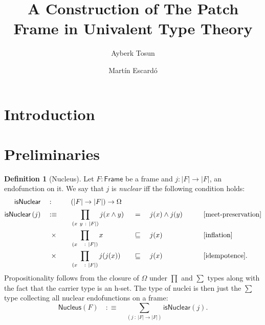\documentclass[11pt,a4paper]{article}
\title{A Construction of The Patch Frame in Univalent Type Theory}
\author{Ayberk Tosun \and Mart\'{i}n Escard\'{o}}
\theoremstyle{definition}
\newtheorem{defn}{Definition}
\newcommand{\is}{:\equiv}
\newcommand{\framenm}{\mathsf{Frame}}
\newcommand{\isnuclearnm}{\mathsf{isNuclear}}
\newcommand{\isnuclear}[1]{\isnuclearnm{}\left(#1\right)}
\newcommand{\nucleus}{\mathsf{Nucleus}}
\newcommand{\abs}[1]{\left| #1 \right|}
\newcommand{\hprop}{\Omega}
\newcommand{\meet}[2]{#1 \wedge #2}
\newcommand{\pity}[3]{\prod_{(#1~:~#2)} #3}
\newcommand{\sigmaty}[3]{\sum_{(#1~:~#2)} #3}
\begin{document}
\maketitle

\begin{abstract}
\end{abstract}

\section{Introduction}


\section{Preliminaries}

\begin{defn}[Nucleus]\label{defn:nucleus}
  Let $F : \framenm{}$ be a frame and $j : \abs{F} \rightarrow \abs{F}$, an endofunction
  on it. We say that $j$ is \emph{nuclear} iff the following condition holds:
  \begin{alignat*}{5}
    \isnuclearnm{}\quad&:\quad &&(\abs{F} \rightarrow \abs{F}) \rightarrow \hprop{} && && &&              \\
    \isnuclear{j} \quad&\is\quad
       &&\pity{x~y}{\abs{F}}{j(\meet{x}{y}) &&~=~ &&\meet{j(x)}{j(y)}}   &&\qquad[\text{meet-preservation}]\\
      &\hspace{0.5em}\times\quad &&\pity{x~~}{\abs{F}}{x &&~\sqsubseteq~ &&j(x)}            &&\qquad[\text{inflation}]  \\
      &\hspace{0.5em}\times\quad &&\pity{x~~}{\abs{F}}{j(j(x)) &&~\sqsubseteq~ &&j(x)}      &&\qquad[\text{idempotence}].
  \end{alignat*}
  Propositionality follows from the closure of $\Omega$ under $\prod$ and $\sum$ types along
  with the fact that the carrier type is an h-set. The type of nuclei is then
  just the $\sum$ type collecting all nuclear endofunctions on a frame:
  \begin{equation*}
    \nucleus{}(F) \quad\is\quad \sigmaty{j}{\abs{F} \rightarrow \abs{F}}{\isnuclear{j}}.
  \end{equation*}
\end{defn}
\printbibliography
\end{document}
